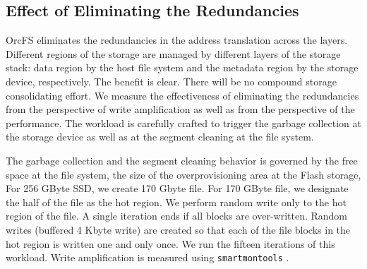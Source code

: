 \documentclass[prodmode,acmtecs]{acmsmall}
\begin{document}

\subsection{Effect of Eliminating the Redundancies}
\label{subsec:remove_gc_overhead}

OrcFS eliminates the redundancies in the address translation across 
the layers. Different regions of the storage are managed by different 
layers of the storage stack: data region by the host file system and the 
metadata region by the storage device, respectively. The benefit is 
clear. There will be no compound storage consolidating effort. We measure 
the effectiveness of eliminating the redundancies from the perspective of 
write amplification as well as from the perspective of the performance. 
The workload is carefully crafted to trigger the garbage collection at 
the storage device as well as at the segment cleaning at the file system. 

The garbage collection and the segment cleaning behavior is governed by 
the free space at the file system, the size of the overprovisioning area 
at the Flash storage, For 256 GByte SSD, we create 170 Gbyte file. For 
170 GByte file, we designate the half of the file as the hot region. We  
perform random write only to the hot region of the file. A single iteration 
ends if all blocks are over-written. Random writes (buffered 4 Kbyte write) 
are created so that each of the file blocks in the hot region is written 
one and only once. We run the fifteen iterations of this workload. Write 
amplification is measured using \texttt{smartmontools} \cite{smartmontools}.
\end{document}
